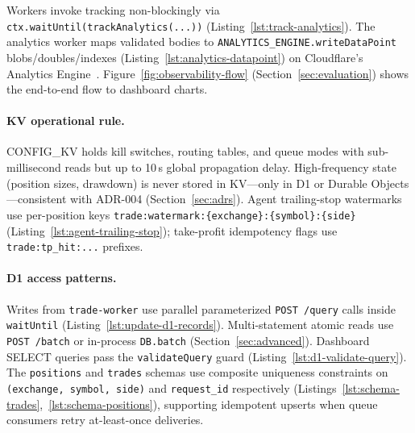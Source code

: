 Workers invoke tracking non-blockingly via \texttt{ctx.waitUntil(trackAnalytics(...))} (Listing~\ref{lst:track-analytics}). The analytics worker maps validated bodies to \texttt{ANALYTICS\_ENGINE.writeDataPoint} blobs/doubles/indexes (Listing~\ref{lst:analytics-datapoint}) on Cloudflare's Analytics Engine~\cite{cloudflare-analytics-engine}. Figure~\ref{fig:observability-flow} (Section~\ref{sec:evaluation}) shows the end-to-end flow to dashboard charts.


\paragraph{KV operational rule.} CONFIG\_KV holds kill switches, routing tables, and queue modes with sub-millisecond reads but up to 10\,s global propagation delay. High-frequency state (position sizes, drawdown) is never stored in KV---only in D1 or Durable Objects---consistent with ADR-004 (Section~\ref{sec:adrs}). Agent trailing-stop watermarks use per-position keys \texttt{trade:watermark:\{exchange\}:\{symbol\}:\{side\}} (Listing~\ref{lst:agent-trailing-stop}); take-profit idempotency flags use \texttt{trade:tp\_hit:...} prefixes.

\paragraph{D1 access patterns.} Writes from \texttt{trade-worker} use parallel parameterized \texttt{POST /query} calls inside \texttt{waitUntil} (Listing~\ref{lst:update-d1-records}). Multi-statement atomic reads use \texttt{POST /batch} or in-process \texttt{DB.batch} (Section~\ref{sec:advanced}). Dashboard SELECT queries pass the \texttt{validateQuery} guard (Listing~\ref{lst:d1-validate-query}). The \texttt{positions} and \texttt{trades} schemas use composite uniqueness constraints on \texttt{(exchange, symbol, side)} and \texttt{request\_id} respectively (Listings~\ref{lst:schema-trades},~\ref{lst:schema-positions}), supporting idempotent upserts when queue consumers retry at-least-once deliveries.